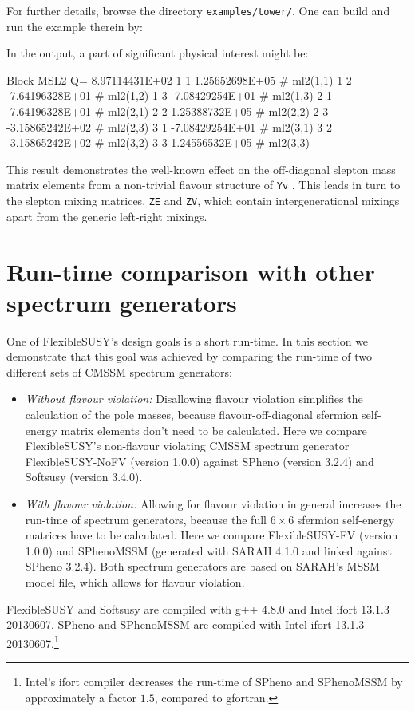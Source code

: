 \documentclass[final,3p,11pt,pdflatex]{elsarticle}
\makeatletter
\newcommand{\fs}{FlexibleSUSY\@\xspace}
\newcommand{\code}[1]{\lstinline|#1|}  %
\makeatother
\begin{document}
For further details, browse the directory \code{examples/tower/}.
One can build and run the example therein by:
In the output,
a part of significant physical interest might be:
\begin{numlstlisting}
Block MSL2 Q=   8.97114431E+02
  1  1     1.25652698E+05   # ml2(1,1)
  1  2    -7.64196328E+01   # ml2(1,2)
  1  3    -7.08429254E+01   # ml2(1,3)
  2  1    -7.64196328E+01   # ml2(2,1)
  2  2     1.25388732E+05   # ml2(2,2)
  2  3    -3.15865242E+02   # ml2(2,3)
  3  1    -7.08429254E+01   # ml2(3,1)
  3  2    -3.15865242E+02   # ml2(3,2)
  3  3     1.24556532E+05   # ml2(3,3)
\end{numlstlisting}
This result demonstrates the well-known effect on
the off-diagonal slepton mass matrix elements
from a non-trivial flavour structure of \code{Yv}
\cite{Borzumati:1986qx}.
This leads in turn to the slepton mixing
matrices, \code{ZE} and \code{ZV},
which contain intergenerational mixings apart from the
generic left-right mixings.

\section{Run-time comparison with other spectrum generators}
\label{Sec:comparison}

One of \fs's design goals is a short run-time.  In this section we
demonstrate that this goal was achieved by comparing the run-time of
two different sets of CMSSM spectrum generators:
%
\begin{itemize}
\item \emph{Without flavour violation:} Disallowing flavour violation
  simplifies the calculation of the pole masses, because
  flavour-off-diagonal sfermion self-energy matrix elements don't need
  to be calculated.  Here we compare \fs's non-flavour violating CMSSM
  spectrum generator FlexibleSUSY-NoFV (version 1.0.0) against SPheno
  (version 3.2.4) and Softsusy (version 3.4.0).
%
\item \emph{With flavour violation:} Allowing for flavour violation in
  general increases the run-time of spectrum generators, because the
  full $6$ sfermion self-energy matrices have to be
  calculated.  Here we compare FlexibleSUSY-FV (version 1.0.0) and
  SPhenoMSSM (generated with SARAH 4.1.0 and linked against SPheno
  3.2.4).  Both spectrum generators are based on SARAH's MSSM model
  file, which allows for flavour violation.
\end{itemize}
%
FlexibleSUSY and Softsusy are compiled with g++ 4.8.0 and Intel ifort
13.1.3 20130607.  SPheno and SPhenoMSSM are compiled with Intel ifort
13.1.3 20130607.\footnote{Intel's ifort compiler decreases the
  run-time of SPheno and SPhenoMSSM by approximately a factor $1.5$,
  compared to gfortran.}
\end{document}
